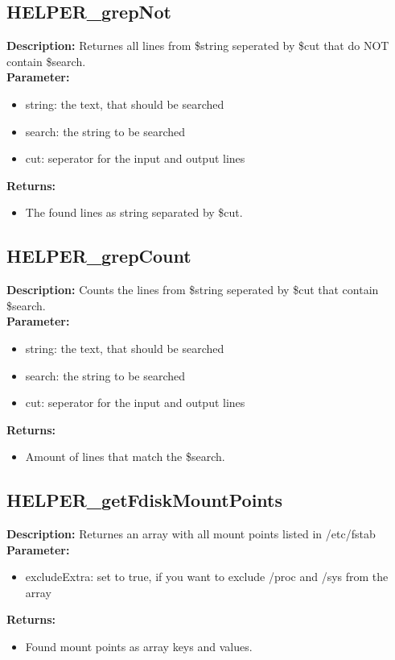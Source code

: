 \subsection{HELPER\_grepNot}
\textbf{Description:} Returnes all lines from \$string seperated by \$cut that do NOT contain \$search.\\
\textbf{Parameter:}
\begin{itemize}
\item string: the text, that should be searched
\item search: the string to be searched
\item cut: seperator for the input and output lines
\end{itemize}
\textbf{Returns:}
\begin{itemize}
\item The found lines as string separated by \$cut.
\end{itemize}

\subsection{HELPER\_grepCount}
\textbf{Description:} Counts the lines from \$string seperated by \$cut that contain \$search.\\
\textbf{Parameter:}
\begin{itemize}
\item string: the text, that should be searched
\item search: the string to be searched
\item cut: seperator for the input and output lines
\end{itemize}
\textbf{Returns:}
\begin{itemize}
\item Amount of lines that match the \$search.
\end{itemize}

\subsection{HELPER\_getFdiskMountPoints}
\textbf{Description:} Returnes an array with all mount points listed in /etc/fstab\\
\textbf{Parameter:}
\begin{itemize}
\item excludeExtra: set to true, if you want to exclude /proc and /sys from the array
\end{itemize}
\textbf{Returns:}
\begin{itemize}
\item Found mount points as array keys and values.
\end{itemize}

